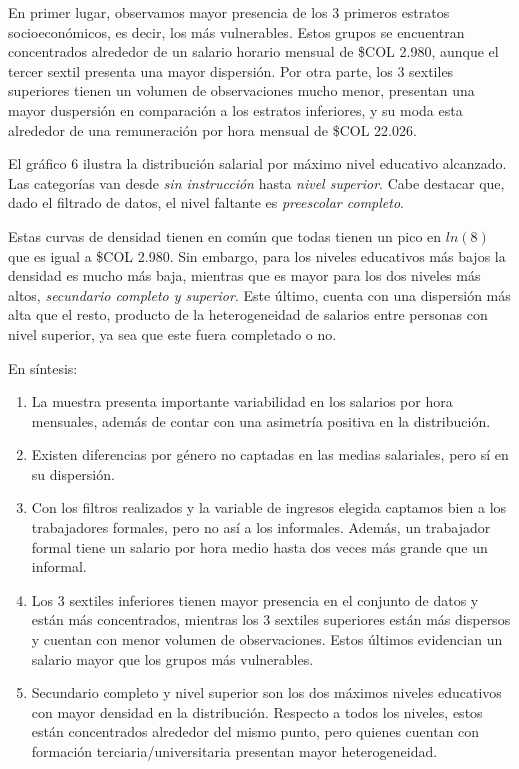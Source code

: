 \documentclass[11pt,oneside]{article}
\begin{document}
	
	En primer lugar, observamos mayor presencia de los 3 primeros estratos socioeconómicos, es decir, los más vulnerables. Estos grupos se encuentran concentrados alrededor de un salario horario mensual de \$COL 2.980, aunque el tercer sextil presenta una mayor dispersión. Por otra parte, los 3 sextiles superiores tienen un volumen de observaciones mucho menor, presentan una mayor duspersión en comparación a los estratos inferiores, y su moda esta alrededor de una remuneración por hora mensual de \$COL 22.026. 
	
	El gráfico 6 ilustra la distribución salarial por máximo nivel educativo alcanzado. Las categorías van desde \textit{sin instrucción} hasta \textit{nivel superior}. Cabe destacar que, dado el filtrado de datos, el nivel faltante es \textit{preescolar completo}.
	
	
	Estas curvas de densidad tienen en común que todas tienen un pico en $ln(8)$ que es igual a \$COL 2.980. Sin embargo, para los niveles educativos más bajos la densidad es mucho más baja, mientras que es mayor para los dos niveles más altos, \textit{secundario completo y superior}. Este último, cuenta con una dispersión más alta que el resto, producto de la heterogeneidad de salarios entre personas con nivel superior, ya sea que este fuera completado o no. 
	
	En síntesis:
	\begin{enumerate}
		\item La muestra presenta importante variabilidad en los salarios por hora mensuales, además de contar con una asimetría positiva en la distribución.
		\item Existen diferencias por género no captadas en las medias salariales, pero sí en su dispersión.
		\item Con los filtros realizados y la variable de ingresos elegida captamos bien a los trabajadores formales, pero no así a los informales. Además, un trabajador formal tiene un salario por hora medio hasta dos veces más grande que un informal. 
		\item Los 3 sextiles inferiores tienen mayor presencia en el conjunto de datos y están más concentrados, mientras los 3 sextiles superiores están más dispersos y cuentan con menor volumen de observaciones. Estos últimos evidencian un salario mayor que los grupos más vulnerables.
		\item Secundario completo y nivel superior son los dos máximos niveles educativos con mayor densidad en la distribución. Respecto a todos los niveles, estos están concentrados alrededor del mismo punto, pero quienes cuentan con formación terciaria/universitaria presentan mayor heterogeneidad. 
	\end{enumerate}
	
\end{document}
